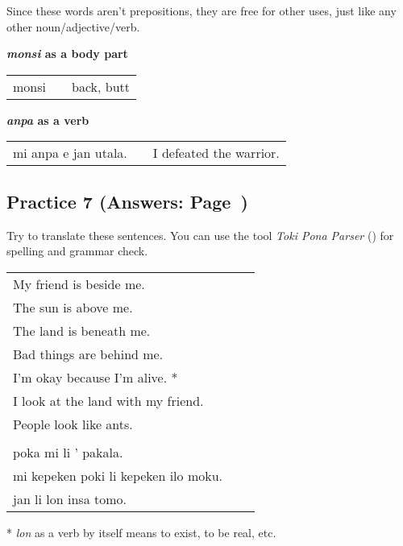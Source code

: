 Since these words aren't prepositions, they are free for other uses, just like any other noun/adjective/verb.

\textbf{\textit{monsi} as a body part} \\
\begin{supertabular}{p{5,5cm}|ll}
monsi && back, butt \\
\end{supertabular} 

\textbf{\textit{anpa} as a verb} \\
\begin{supertabular}{p{5,5cm}|ll}
mi anpa e jan utala. && I defeated the warrior. \\
\end{supertabular} 
%
\subsection*{Practice 7 (Answers: Page~\pageref{'other_prepositions'})}
%
Try to translate these sentences. 
You can use the tool \textit{Toki Pona Parser} (\cite{www:rowa:02}) for spelling and grammar check. 

\begin{supertabular}{p{5,5cm}|ll}
My friend is beside me. && \\ %
The sun is above me. && \\ %
The land is beneath me. && \\ %
Bad things are behind me. && \\ %
I'm okay because I'm alive. * && \\ %
I look at the land with my friend. && \\ %
People look like ants. && \\ %
 && \\ %
poka mi li ' pakala. && \\ %
mi kepeken poki li kepeken ilo moku. && \\ %
jan li lon insa tomo. && \\ %
\end{supertabular} 

* \textit{lon} as a verb by itself means to exist, to be real, etc. 
% 
